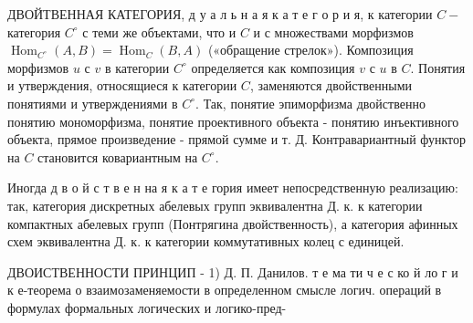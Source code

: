 \documentclass[10pt]{article}
\begin{document}
ДВОЙТВЕННАЯ КАТЕГОРИЯ, д у а л ь н а я к а т е г о р и я, к категории $C-$ категория $C^{\circ}$ с теми же объектами, что и $C$ и с множествами морфизмов $\operatorname{Hom}_{C^{\circ}}(A, B)=\operatorname{Hom}_{C}(B, A)$ («обращение стрелок»). Композиция морфизмов $u$ с $v$ в категории $C^{\circ}$ определяется как композиция $v$ с $u$ в $C$. Понятия и утверждения, относящиеся к категории $C$, заменяются двойственными понятиями и утверждениями в $C^{\circ}$. Так, понятие эпиморфизма двойственно понятию мономорфизма, понятие проективного объекта - понятию инъективного объекта, прямое произведение - прямой сумме и т. Д. Контравариантный функтор на $C$ становится ковариантным на $C^{\circ}$.



Иногда д в о й с т в е н на я к а т е гория имеет непосредственную реализацию: так, категория дискретных абелевых групп эквивалентна Д. к. к категории компактных абелевых групп (Понтрягина двойственность), а категория афинных схем эквивалентна Д. к. к категории коммутативных колец с единицей.



ДВОИСТВЕННОСТИ ПРИНЦИП - 1) Д. П. Данилов. т е ма ти ч е с ко й ло г и к е-теорема $о$ взаимозаменяемости в определенном смысле логич. операций в формулах формальных логических и логико-пред-
\end{document}
